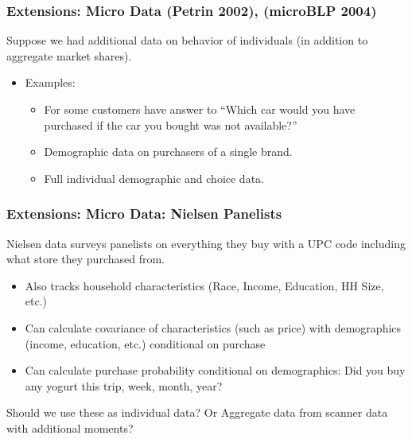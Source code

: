 \documentclass[xcolor=pdftex,dvipsnames,table,mathserif,aspectratio=169]{beamer}
\begin{document}
\begin{frame}
\frametitle{Extensions: Micro Data (Petrin 2002), (microBLP 2004)}
Suppose we had additional data on behavior of individuals (in addition to aggregate market shares).
\begin{itemize}
\item Examples:
\begin{itemize}
\item For some customers have answer to ``Which car would you have purchased if the car you bought was not available?''
\item Demographic data on purchasers of a single brand.
\item Full individual demographic and choice data.
\end{itemize}
\end{itemize}
\end{frame}

\begin{frame}
\frametitle{Extensions: Micro Data: Nielsen Panelists}
Nielsen data surveys panelists on everything they buy with a UPC code including what store they purchased from.
\begin{itemize}
\item Also tracks household characteristics (Race, Income, Education, HH Size, etc.)
\item Can calculate covariance of characteristics (such as price) with demographics (income, education, etc.) \alert{conditional on purchase}
\item Can calculate purchase probability conditional on demographics: Did you buy any yogurt this trip, week, month, year?
\end{itemize}
Should we use these as individual data? Or Aggregate data from scanner data with additional moments?
\end{frame}
\end{document}
